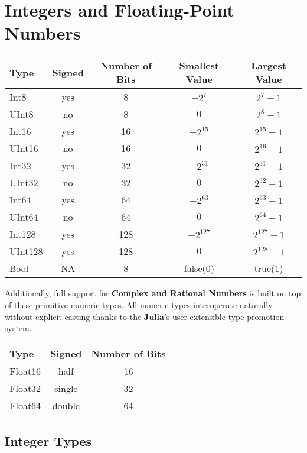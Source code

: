 \documentclass[
]{article}
\begin{document}
\newpage

\hypertarget{integers-and-floating-point-numbers}{%
\section{Integers and Floating-Point
Numbers}\label{integers-and-floating-point-numbers}}

\begin{longtable}[]{@{}lcccc@{}}
\toprule\noalign{}
Type & Signed & Number of Bits & Smallest Value & Largest Value \\
\midrule\noalign{}
\endhead
\bottomrule\noalign{}
\endlastfoot
Int8 & yes & 8 & \(-2^{7}\) & \(2^{7} - 1\) \\
UInt8 & no & 8 & \(0\) & \(2^{8} - 1\) \\
Int16 & yes & 16 & \(-2^{15}\) & \(2^{15} - 1\) \\
UInt16 & no & 16 & \(0\) & \(2^{16} - 1\) \\
Int32 & yes & 32 & \(-2^{31}\) & \(2^{31} - 1\) \\
UInt32 & no & 32 & \(0\) & \(2^{32}-1\) \\
Int64 & yes & 64 & \(-2^{63}\) & \(2^{63} - 1\) \\
UInt64 & no & 64 & \(0\) & \(2^{64} - 1\) \\
Int128 & yes & 128 & \(-2^{127}\) & \(2^{127} - 1\) \\
UInt128 & yes & 128 & \(0\) & \(2^{128} - 1\) \\
Bool & NA & 8 & false(0) & true(1) \\
\end{longtable}

Additionally, full support for \textbf{Complex and Rational Numbers} is
built on top of these primitive numeric types. All numeric types
interoperate naturally without explicit casting thanks to the
\textbf{Julia}'s user-extensible type promotion system.

\begin{longtable}[]{@{}lcc@{}}
\toprule\noalign{}
Type & Signed & Number of Bits \\
\midrule\noalign{}
\endhead
\bottomrule\noalign{}
\endlastfoot
Float16 & half & 16 \\
Float32 & single & 32 \\
Float64 & double & 64 \\
\end{longtable}

\hypertarget{integer-types}{%
\subsection{Integer Types}\label{integer-types}}
\end{document}
